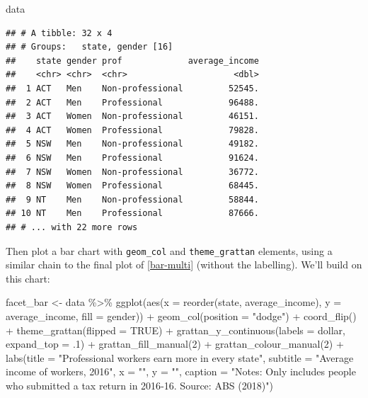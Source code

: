 \documentclass[
]{book}
\newenvironment{Shaded}{\begin{snugshade}}{\end{snugshade}}
\newcommand{\AttributeTok}[1]{\textcolor[rgb]{0.77,0.63,0.00}{#1}}
\newcommand{\ConstantTok}[1]{\textcolor[rgb]{0.00,0.00,0.00}{#1}}
\newcommand{\DecValTok}[1]{\textcolor[rgb]{0.00,0.00,0.81}{#1}}
\newcommand{\FunctionTok}[1]{\textcolor[rgb]{0.00,0.00,0.00}{#1}}
\newcommand{\NormalTok}[1]{#1}
\newcommand{\OtherTok}[1]{\textcolor[rgb]{0.56,0.35,0.01}{#1}}
\newcommand{\SpecialCharTok}[1]{\textcolor[rgb]{0.00,0.00,0.00}{#1}}
\newcommand{\StringTok}[1]{\textcolor[rgb]{0.31,0.60,0.02}{#1}}
\begin{document}
\begin{Shaded}
\begin{Highlighting}[]
\NormalTok{data}
\end{Highlighting}
\end{Shaded}

\begin{verbatim}
## # A tibble: 32 x 4
## # Groups:   state, gender [16]
##    state gender prof             average_income
##    <chr> <chr>  <chr>                     <dbl>
##  1 ACT   Men    Non-professional         52545.
##  2 ACT   Men    Professional             96488.
##  3 ACT   Women  Non-professional         46151.
##  4 ACT   Women  Professional             79828.
##  5 NSW   Men    Non-professional         49182.
##  6 NSW   Men    Professional             91624.
##  7 NSW   Women  Non-professional         36772.
##  8 NSW   Women  Professional             68445.
##  9 NT    Men    Non-professional         58844.
## 10 NT    Men    Professional             87666.
## # ... with 22 more rows
\end{verbatim}

Then plot a bar chart with \texttt{geom\_col} and \texttt{theme\_grattan} elements, using a similar chain to the final plot of \ref{bar-multi} (without the labelling). We'll build on this chart:

\begin{Shaded}
\begin{Highlighting}[]
\NormalTok{facet\_bar }\OtherTok{\textless{}{-}}\NormalTok{ data }\SpecialCharTok{\%\textgreater{}\%} 
  \FunctionTok{ggplot}\NormalTok{(}\FunctionTok{aes}\NormalTok{(}\AttributeTok{x =} \FunctionTok{reorder}\NormalTok{(state, average\_income),}
             \AttributeTok{y =}\NormalTok{ average\_income,}
             \AttributeTok{fill =}\NormalTok{ gender)) }\SpecialCharTok{+} 
  \FunctionTok{geom\_col}\NormalTok{(}\AttributeTok{position =} \StringTok{"dodge"}\NormalTok{) }\SpecialCharTok{+} 
  \FunctionTok{coord\_flip}\NormalTok{() }\SpecialCharTok{+} 
  \FunctionTok{theme\_grattan}\NormalTok{(}\AttributeTok{flipped =} \ConstantTok{TRUE}\NormalTok{) }\SpecialCharTok{+} 
  \FunctionTok{grattan\_y\_continuous}\NormalTok{(}\AttributeTok{labels =}\NormalTok{ dollar, }
                       \AttributeTok{expand\_top =}\NormalTok{ .}\DecValTok{1}\NormalTok{) }\SpecialCharTok{+} 
  \FunctionTok{grattan\_fill\_manual}\NormalTok{(}\DecValTok{2}\NormalTok{) }\SpecialCharTok{+} 
  \FunctionTok{grattan\_colour\_manual}\NormalTok{(}\DecValTok{2}\NormalTok{) }\SpecialCharTok{+} 
  \FunctionTok{labs}\NormalTok{(}\AttributeTok{title =} \StringTok{"Professional workers earn more in every state"}\NormalTok{,}
       \AttributeTok{subtitle =} \StringTok{"Average income of workers, 2016"}\NormalTok{,}
       \AttributeTok{x =} \StringTok{""}\NormalTok{,}
       \AttributeTok{y =} \StringTok{""}\NormalTok{,}
       \AttributeTok{caption =} \StringTok{"Notes: Only includes people who submitted a tax return in 2016{-}16. Source: ABS (2018)"}\NormalTok{)}
\end{Highlighting}
\end{Shaded}
\end{document}
